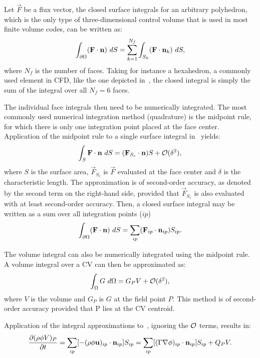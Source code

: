 Let $\vec{F}$ be a flux vector, the closed surface integrals for an arbitrary polyhedron, which is the only type of three-dimensional control volume that is used in most finite volume codes, can be written as:
\begin{equation}
    \int_{\partial \Omega} (\mathbf{F}\cdot \mathbf{n})~dS = \sum_{k=1}^{N_f} \int_{S_k} (\mathbf{F}\cdot\mathbf{n}_k)~dS
    \label{eq:surfint},
\end{equation}
where $N_f$ is the number of faces. Taking for instance a hexahedron, a commonly used element in CFD, like the one depicted in~, the closed integral is simply the sum of the integral over all $N_f = 6$ faces. 

The individual face integrals then need to be numerically integrated. The most commonly used numerical integration method (quadrature) is the midpoint rule, for which there is only one integration point placed at the face center. Application of the midpoint rule to a single surface integral in~ yields:
\begin{equation*}
   \int_{S} \mathbf{F}\cdot\mathbf{n}~dS = (\mathbf{F}_{S_c}\cdot\mathbf{n}) S + \mathcal{O}(\delta^2),
\end{equation*}
where $S$ is the surface area, $\vec{F}_{S_c}$ is $\vec{F}$ evaluated at the face center and $\delta$ is the characteristic length.  The approximation is of second-order accuracy, as denoted by the second term on the right-hand side, provided that $\vec{F}_{S_c}$ is also evaluated with at least second-order accuracy. Then, a closed surface integral may be written as a sum over all integration points ($ip$)
\begin{equation*}
    \int_{\partial \Omega} (\mathbf{F}\cdot\mathbf{n})~dS = \sum_{ip} (\mathbf{F}_{ip}\cdot\mathbf{n}_{ip}) S_{ip}.
\end{equation*}

The volume integral can also be numerically integrated using the midpoint rule. A volume integral over a CV can then be approximated as:
\begin{equation*}
    \int_\Omega G~d\Omega = G_{P} V + \mathcal{O}(\delta^2),
\end{equation*}
where $V$ is the volume and $G_{P}$ is $G$ at the field point $P$. This method is of second-order accuracy provided that P lies at the CV centroid. 

Application of the integral approximations to~, ignoring the $\mathcal{O}$ terms, results in:
\begin{equation}
     \frac{\partial (\rho\phi V )_P}{\partial t} 
    =
    \sum_{ip} [-(\rho\phi\mathbf{u})_{ip}\cdot\mathbf{n}_{ip}] S_{ip}
    = \sum_{ip} [(\Gamma\nabla\phi)_{ip}\cdot\mathbf{n}_{ip}] S_{ip}
    + Q_P V
    \label{eq:spatial}.
\end{equation}

